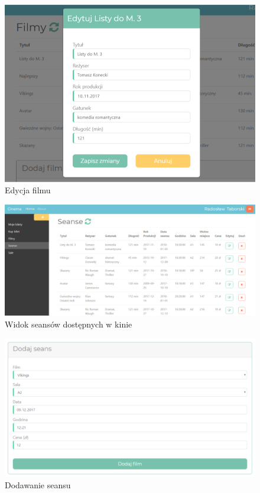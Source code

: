 \begin{figure} [H]
	\centering
	\includegraphics[width=1\linewidth]{rozdzial05/interfejs/edytujFilm.png}
	\caption{Edycja filmu}
	\label{fig:screen6}
\end{figure}

\begin{figure} [H]
	\centering
	\includegraphics[width=1\linewidth]{rozdzial05/interfejs/seanse.png}
	\caption{Widok seansów dostępnych w kinie}
	\label{fig:screen7}
\end{figure}

\begin{figure} [H]
	\centering
	\includegraphics[width=1\linewidth]{rozdzial05/interfejs/dodajSeans.png}
	\caption{Dodawanie seansu}
	\label{fig:screen8}
\end{figure}

